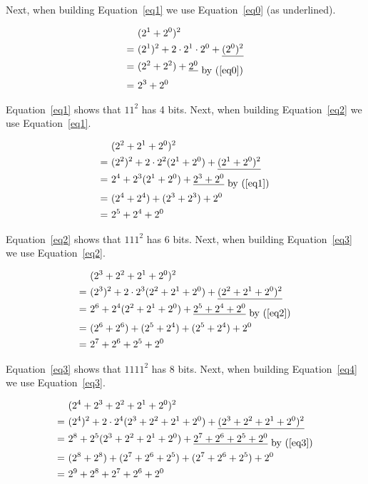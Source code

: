 \documentclass{article}
\begin{document}
 Next, when building Equation~\ref{eq1} we use Equation~\ref{eq0} (as underlined).


 \begin{eqnarray} \label{eq1}
   &  (2^1+2^0)^2 \nonumber\\
   =\ & (2^1)^2+2\cdot2^1\cdot2^0+\underline{(2^0)^2} \nonumber\\
   =\  & (2^2+2^2)+\underline{2^0}_{\mbox{ by (\ref{eq0})}} \nonumber\\
   =\  & 2^3+2^0
\end{eqnarray}

Equation~\ref{eq1} shows that $11^2$ has 4 bits. Next, when building Equation~\ref{eq2} we use Equation~\ref{eq1}.

\begin{eqnarray} \label{eq2}
    & (2^2+2^1+2^0)^2\nonumber\\
   =\ & (2^2)^2+2\cdot2^2(2^1+2^0)+\underline{(2^1+2^0)^2}\nonumber\\
   =\ & 2^4+2^3(2^1+2^0)+\underline{2^3+2^0}_{\mbox{ by (\ref{eq1})}}\nonumber\\
   =\ & (2^4+2^4)+(2^3+2^3)+2^0\nonumber\\
   =\ & 2^5+2^4+2^0
\end{eqnarray}

Equation~\ref{eq2} shows that $111^2$ has 6 bits. Next, when building Equation~\ref{eq3} we use Equation~\ref{eq2}.

\begin{eqnarray} \label{eq3}
    & (2^3+2^2+2^1+2^0)^2\nonumber\\
   =\ & (2^3)^2+2\cdot2^3(2^2+2^1+2^0)+\underline{(2^2+2^1+2^0)^2}\nonumber\\
   =\ & 2^6+2^4(2^2+2^1+2^0)+\underline{2^5+2^4+2^0}_{\mbox{ by (\ref{eq2})}}\nonumber\\
   =\ & (2^6+2^6)+(2^5+2^4)+(2^5+2^4)+2^0\nonumber\\
   =\ & 2^7+2^6+2^5+2^0
\end{eqnarray}

Equation~\ref{eq3} shows that $1111^2$ has 8 bits. Next, when building Equation~\ref{eq4} we use Equation~\ref{eq3}.


\begin{eqnarray} \label{eq4}
    & (2^4+2^3+2^2+2^1+2^0)^2\nonumber\\
   =\ & (2^4)^2+2\cdot2^4(2^3+2^2+2^1+2^0)+\underline{(2^3+2^2+2^1+2^0)^2}\nonumber\\
   =\ & 2^8+2^5(2^3+2^2+2^1+2^0)+\underline{2^7+2^6+2^5+2^0}_{\mbox{ by (\ref{eq3})}}\nonumber\\
   =\ & (2^8+2^8)+(2^7+2^6+2^5)+(2^7+2^6+2^5)+2^0\nonumber\\
   =\ & 2^9+2^8+2^7+2^6+2^0
\end{eqnarray}
\end{document}
